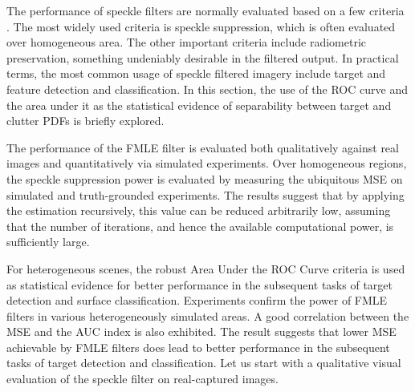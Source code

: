 
The performance of speckle filters are normally evaluated based on a few criteria \citep{Nyoungui_2002_IntlJRemoteSense}.
The most widely used criteria is speckle suppression, 
  which is often evaluated over homogeneous area.
The other important criteria include radiometric preservation, something undeniably desirable in the filtered output.
In practical terms, the most common usage of speckle filtered imagery include target and feature detection and classification.
In this section, the use of the ROC curve and the area under it as the statistical evidence of separability between target and clutter PDFs is briefly explored.

The performance of the FMLE filter is evaluated both qualitatively against real
images and quantitatively via simulated experiments. 
Over homogeneous regions, the speckle suppression power is
evaluated by measuring the ubiquitous MSE on simulated and truth-grounded experiments. 
The results suggest that by applying the estimation recursively, this value can be reduced arbitrarily low, assuming that the number of iterations, and hence the available computational power, is sufficiently large.

For heterogeneous scenes, the robust Area Under the ROC Curve criteria is used as
statistical evidence for better performance in the subsequent tasks of target detection
and surface classification. 
Experiments confirm the power of FMLE filters in various
heterogeneously simulated areas. 
A good correlation between the MSE and the AUC index is also exhibited. 
The result suggests that lower MSE achievable by FMLE filters does lead to better performance in the subsequent tasks of target detection and classification.
Let us start with a qualitative visual evaluation of the speckle filter on real-captured images.


